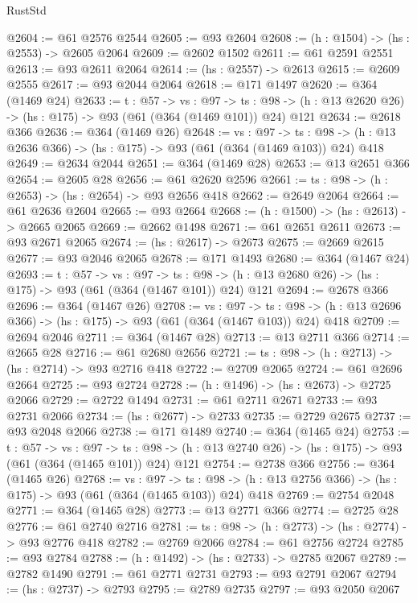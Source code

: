 \begin{lexlean}{RustStd}
\begin{coremodule}
@2604 := @61 @2576 @2544
@2605 := @93 @2604
@2608 := (h : @1504) -> (hs : @2553) -> @2605 @2064
@2609 := @2602 @1502
@2611 := @61 @2591 @2551
@2613 := @93 @2611 @2064
@2614 := (hs : @2557) -> @2613
@2615 := @2609 @2555
@2617 := @93 @2044 @2064
@2618 := @171 @1497
@2620 := @364 (@1469 @24)
@2633 := {t : @57} ->
  {vs : @97} ->
  {ts : @98} -> (h : @13 @2620 @26) -> (hs : @175) -> @93 (@61 (@364 (@1469 @101)) @24) @121
@2634 := @2618 @366
@2636 := @364 (@1469 @26)
@2648 := {vs : @97} ->
  {ts : @98} -> (h : @13 @2636 @366) -> (hs : @175) -> @93 (@61 (@364 (@1469 @103)) @24) @418
@2649 := @2634 @2044
@2651 := @364 (@1469 @28)
@2653 := @13 @2651 @366
@2654 := @2605 @28
@2656 := @61 @2620 @2596
@2661 := {ts : @98} -> (h : @2653) -> (hs : @2654) -> @93 @2656 @418
@2662 := @2649 @2064
@2664 := @61 @2636 @2604
@2665 := @93 @2664
@2668 := (h : @1500) -> (hs : @2613) -> @2665 @2065
@2669 := @2662 @1498
@2671 := @61 @2651 @2611
@2673 := @93 @2671 @2065
@2674 := (hs : @2617) -> @2673
@2675 := @2669 @2615
@2677 := @93 @2046 @2065
@2678 := @171 @1493
@2680 := @364 (@1467 @24)
@2693 := {t : @57} ->
  {vs : @97} ->
  {ts : @98} -> (h : @13 @2680 @26) -> (hs : @175) -> @93 (@61 (@364 (@1467 @101)) @24) @121
@2694 := @2678 @366
@2696 := @364 (@1467 @26)
@2708 := {vs : @97} ->
  {ts : @98} -> (h : @13 @2696 @366) -> (hs : @175) -> @93 (@61 (@364 (@1467 @103)) @24) @418
@2709 := @2694 @2046
@2711 := @364 (@1467 @28)
@2713 := @13 @2711 @366
@2714 := @2665 @28
@2716 := @61 @2680 @2656
@2721 := {ts : @98} -> (h : @2713) -> (hs : @2714) -> @93 @2716 @418
@2722 := @2709 @2065
@2724 := @61 @2696 @2664
@2725 := @93 @2724
@2728 := (h : @1496) -> (hs : @2673) -> @2725 @2066
@2729 := @2722 @1494
@2731 := @61 @2711 @2671
@2733 := @93 @2731 @2066
@2734 := (hs : @2677) -> @2733
@2735 := @2729 @2675
@2737 := @93 @2048 @2066
@2738 := @171 @1489
@2740 := @364 (@1465 @24)
@2753 := {t : @57} ->
  {vs : @97} ->
  {ts : @98} -> (h : @13 @2740 @26) -> (hs : @175) -> @93 (@61 (@364 (@1465 @101)) @24) @121
@2754 := @2738 @366
@2756 := @364 (@1465 @26)
@2768 := {vs : @97} ->
  {ts : @98} -> (h : @13 @2756 @366) -> (hs : @175) -> @93 (@61 (@364 (@1465 @103)) @24) @418
@2769 := @2754 @2048
@2771 := @364 (@1465 @28)
@2773 := @13 @2771 @366
@2774 := @2725 @28
@2776 := @61 @2740 @2716
@2781 := {ts : @98} -> (h : @2773) -> (hs : @2774) -> @93 @2776 @418
@2782 := @2769 @2066
@2784 := @61 @2756 @2724
@2785 := @93 @2784
@2788 := (h : @1492) -> (hs : @2733) -> @2785 @2067
@2789 := @2782 @1490
@2791 := @61 @2771 @2731
@2793 := @93 @2791 @2067
@2794 := (hs : @2737) -> @2793
@2795 := @2789 @2735
@2797 := @93 @2050 @2067

\end{coremodule}
\end{lexlean}
